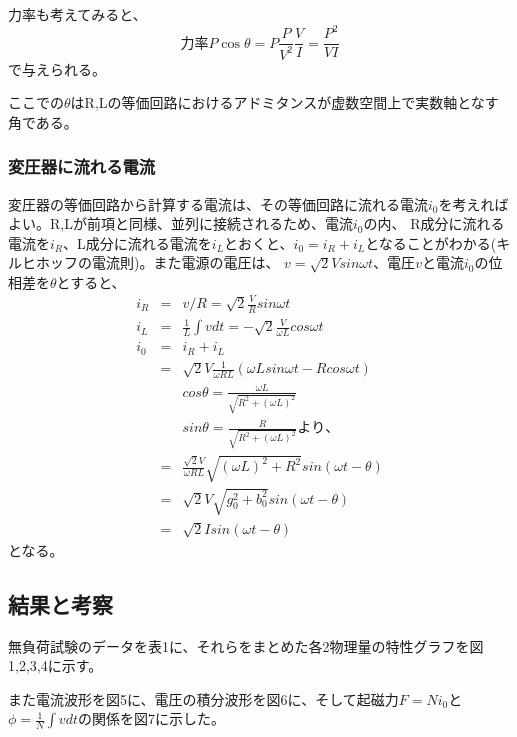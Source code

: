\documentclass[11pt,a4j]{jsarticle}
\begin{document}
   力率も考えてみると、
   \begin{equation}
    力率P\cos{\theta} = P \frac{P}{V^2} \frac{V}{I} = \frac{P^2}{VI} 
   \end{equation}
   で与えられる。
   
   ここでの$\theta$はR,Lの等価回路におけるアドミタンスが虚数空間上で実数軸となす角である。
   
   \subsubsection{変圧器に流れる電流}
   変圧器の等価回路から計算する電流は、その等価回路に流れる電流$i_0$を考えればよい。R,Lが前項と同様、並列に接続されるため、電流$i_0$の内、
   R成分に流れる電流を$i_R$、L成分に流れる電流を$i_L$とおくと、$i_0 = i_R + i_L$となることがわかる(キルヒホッフの電流則)。また電源の電圧は、
   $v = \sqrt{2} V sin\omega t$、電圧$v$と電流$i_0$の位相差を$\theta$とすると、
   \begin{eqnarray}
    i_R &=& v/R = \sqrt{2} \frac{V}{R} sin\omega t \\
    i_L &=& \frac{1}{L}\int vdt = -\sqrt{2}\frac{V}{\omega L} cos\omega t \\
    i_0 &=& i_R + i_L \nonumber \\
        &=& \sqrt{2} V \frac{1}{\omega RL} (\omega Lsin\omega t - R cos\omega t) \nonumber \\
        && cos\theta = \frac{\omega L}{\sqrt{R^2 + (\omega L)^2}} \nonumber \\
        && sin\theta = \frac{R}{\sqrt{R^2 + (\omega L)^2}} より、 \nonumber \\
        &=& \frac{\sqrt{2}V}{\omega RL} \sqrt{(\omega L)^2 + R^2} sin(\omega t - \theta) \nonumber \\
        &=& \sqrt{2} V \sqrt{g_0^2 + b_0^2} sin(\omega t - \theta) \nonumber \\
        &=& \sqrt{2} I sin(\omega t - \theta)
   \end{eqnarray}
   となる。


  \subsection{結果と考察}
  無負荷試験のデータを表1に、それらをまとめた各2物理量の特性グラフを図1,2,3,4に示す。
  
  また電流波形を図5に、電圧の積分波形を図6に、そして起磁力$F=Ni_0$と$\phi = \frac{1}{N} \int v dt$の関係を図7に示した。
\end{document}

